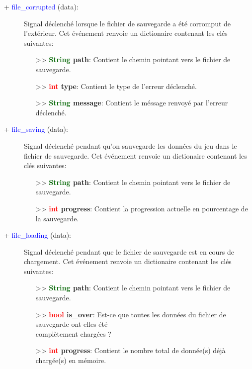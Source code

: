 \documentclass[a4paper, 11pt]{article}
\begin{document}
	\begin{description}
		\item [+ \textcolor{blue}{file\_corrupted} (data):] Signal déclenché lorsque le fichier de
		sauvegarde a été corromput de \\l'extérieur. Cet événement renvoie un dictionaire contenant les 
		clés suivantes:
		\begin{itemize}
			\item [>> \textbf{\textcolor{darkgreen}{String} path}:] Contient le chemin pointant vers le
			fichier de sauvegarde.
			\item [>> \textbf{\textcolor{red}{int} type}:] Contient le type de l'erreur déclenché.
			\item [>> \textbf{\textcolor{darkgreen}{String} message}:] Contient le méssage renvoyé par 
			l'erreur déclenché.\\
		\end{itemize}
	\end{description}
	\begin{description}
		\item [+ \textcolor{blue}{file\_saving} (data):] Signal déclenché pendant qu'on sauvegarde les
		données du jeu dans le fichier de sauvegarde. Cet événement renvoie un dictionaire contenant les
		clés suivantes:
		\begin{itemize}
			\item [>> \textbf{\textcolor{darkgreen}{String} path}:] Contient le chemin pointant vers le
			fichier de sauvegarde.
			\item [>> \textbf{\textcolor{red}{int} progress}:] Contient la progression actuelle en 
			pourcentage de la sauvegarde.\\
		\end{itemize}
	\end{description}
	\begin{description}
		\item [+ \textcolor{blue}{file\_loading} (data):] Signal déclenché pendant que le fichier de
		sauvegarde est en cours de \\chargement. Cet événement renvoie un dictionaire contenant les clés 
		suivantes:
		\begin{itemize}
			\item [>> \textbf{\textcolor{darkgreen}{String} path}:] Contient le chemin pointant vers le
			fichier de sauvegarde.
			\item [>> \textbf{\textcolor{red}{bool} is\_over}:] Est-ce que toutes les données du fichier de
			sauvegarde ont-elles été \\complètement chargées ?
			\item [>> \textbf{\textcolor{red}{int} progress}:] Contient le nombre total de donnée(s) déjà
			chargée(s) en mémoire.\\
		\end{itemize}
	\end{description}
\end{document}
